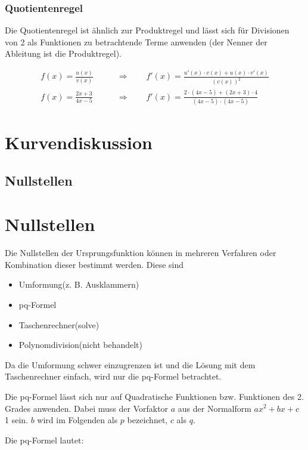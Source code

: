 \subsubsection{Quotientenregel}

Die Quotientenregel ist ähnlich zur Produktregel und lässt sich für Divisionen von 2 als
Funktionen zu betrachtende Terme anwenden (der Nenner der Ableitung ist die Produktregel).

\begin{align*}
    f(x) = \frac{u(x)}{v(x)} \qquad & \Rightarrow \qquad f'(x) = \frac{u'(x) \cdot v(x) + u(x) \cdot v'(x)}{(v(x))^2} \\[15pt]
    f(x) = \frac{2x + 3}{4x - 5} \qquad & \Rightarrow \qquad f'(x) = \frac{2 \cdot (4x - 5) + (2x + 3) \cdot 4}{(4x - 5) \cdot (4x - 5)}
\end{align*}

\section{Kurvendiskussion}

\subsection{Nullstellen}

\section*{Nullstellen}
Die Nullstellen der Ursprungsfunktion können in mehreren Verfahren oder Kombination dieser bestimmt werden. Diese sind
\begin{itemize}
	\item Umformung(z. B. Ausklammern)
	\item pq-Formel
	\item Taschenrechner(solve)
	\item Polynomdivision(nicht behandelt)
\end{itemize}

Da die Umformung schwer einzugrenzen ist und die Lösung mit dem Taschenrechner einfach, wird nur die pq-Formel betrachtet.

Die pq-Formel lässt sich nur auf Quadratische Funktionen bzw. Funktionen des 2. Grades anwenden.
Dabei muss der Vorfaktor $a$ aus der Normalform $ax^2 + bx + c$ 1 sein.
$b$ wird im Folgenden als $p$ bezeichnet, $c$ als $q$.

Die pq-Formel lautet: \newline

